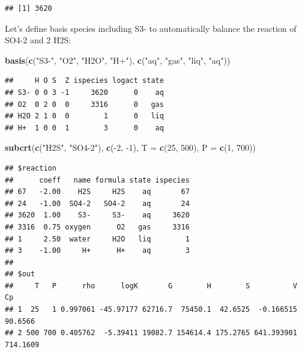\documentclass[]{tufte-handout}
\newenvironment{Shaded}{}{}
\newcommand{\KeywordTok}[1]{\textcolor[rgb]{0.00,0.44,0.13}{\textbf{#1}}}
\newcommand{\DataTypeTok}[1]{\textcolor[rgb]{0.56,0.13,0.00}{#1}}
\newcommand{\DecValTok}[1]{\textcolor[rgb]{0.25,0.63,0.44}{#1}}
\newcommand{\StringTok}[1]{\textcolor[rgb]{0.25,0.44,0.63}{#1}}
\newcommand{\OperatorTok}[1]{\textcolor[rgb]{0.40,0.40,0.40}{#1}}
\newcommand{\NormalTok}[1]{#1}
\begin{document}
\begin{verbatim}
## [1] 3620
\end{verbatim}

Let's define basis species including S3- to automatically balance the
reaction of SO4-2 and 2 H2S:

\begin{Shaded}
\begin{Highlighting}[]
\KeywordTok{basis}\NormalTok{(}\KeywordTok{c}\NormalTok{(}\StringTok{"S3-"}\NormalTok{, }\StringTok{"O2"}\NormalTok{, }\StringTok{"H2O"}\NormalTok{, }\StringTok{"H+"}\NormalTok{), }\KeywordTok{c}\NormalTok{(}\StringTok{"aq"}\NormalTok{, }\StringTok{"gas"}\NormalTok{, }\StringTok{"liq"}\NormalTok{, }\StringTok{"aq"}\NormalTok{))}
\end{Highlighting}
\end{Shaded}

\begin{verbatim}
##     H O S  Z ispecies logact state
## S3- 0 0 3 -1     3620      0    aq
## O2  0 2 0  0     3316      0   gas
## H2O 2 1 0  0        1      0   liq
## H+  1 0 0  1        3      0    aq
\end{verbatim}

\begin{Shaded}
\begin{Highlighting}[]
\KeywordTok{subcrt}\NormalTok{(}\KeywordTok{c}\NormalTok{(}\StringTok{"H2S"}\NormalTok{, }\StringTok{"SO4-2"}\NormalTok{), }\KeywordTok{c}\NormalTok{(}\OperatorTok{-}\DecValTok{2}\NormalTok{, }\OperatorTok{-}\DecValTok{1}\NormalTok{), }\DataTypeTok{T =} \KeywordTok{c}\NormalTok{(}\DecValTok{25}\NormalTok{, }\DecValTok{500}\NormalTok{), }\DataTypeTok{P =} \KeywordTok{c}\NormalTok{(}\DecValTok{1}\NormalTok{, }\DecValTok{700}\NormalTok{))}
\end{Highlighting}
\end{Shaded}

\begin{verbatim}
## $reaction
##      coeff   name formula state ispecies
## 67   -2.00    H2S     H2S    aq       67
## 24   -1.00  SO4-2   SO4-2    aq       24
## 3620  1.00    S3-     S3-    aq     3620
## 3316  0.75 oxygen      O2   gas     3316
## 1     2.50  water     H2O   liq        1
## 3    -1.00     H+      H+    aq        3
## 
## $out
##     T   P      rho      logK       G        H        S          V       Cp
## 1  25   1 0.997061 -45.97177 62716.7  75450.1  42.6525  -0.166515  90.6566
## 2 500 700 0.405762  -5.39411 19082.7 154614.4 175.2765 641.393901 714.1609
\end{verbatim}
\end{document}
